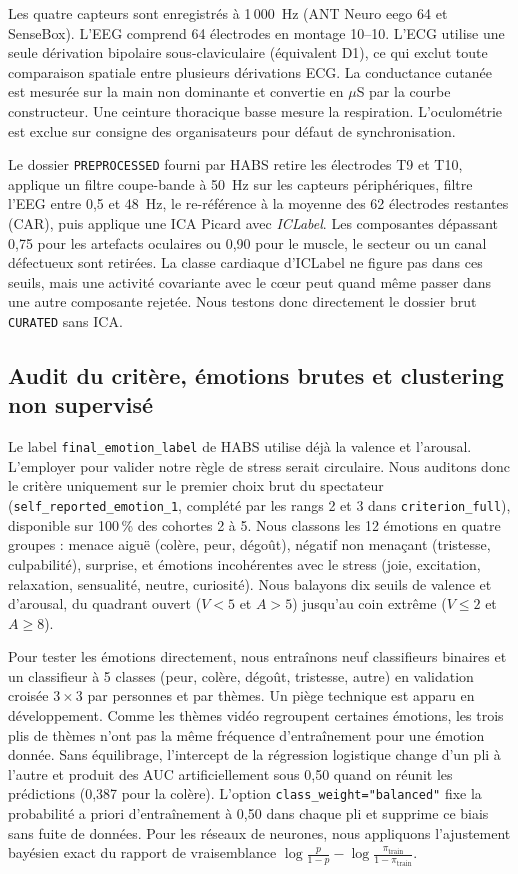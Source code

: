 \documentclass[10pt]{article}
\begin{document}
Les quatre capteurs sont enregistrés à 1\,000~Hz (ANT Neuro eego 64 et SenseBox). L'EEG comprend 64 électrodes en montage 10--10. L'ECG utilise une seule dérivation bipolaire sous-claviculaire (équivalent D1), ce qui exclut toute comparaison spatiale entre plusieurs dérivations ECG. La conductance cutanée est mesurée sur la main non dominante et convertie en $\mu$S par la courbe constructeur. Une ceinture thoracique basse mesure la respiration. L'oculométrie est exclue sur consigne des organisateurs pour défaut de synchronisation.

Le dossier \texttt{PREPROCESSED} fourni par HABS retire les électrodes T9 et T10, applique un filtre coupe-bande à 50~Hz sur les capteurs périphériques, filtre l'EEG entre 0,5 et 48~Hz, le re-référence à la moyenne des 62 électrodes restantes (CAR), puis applique une ICA Picard avec \emph{ICLabel}. Les composantes dépassant 0,75 pour les artefacts oculaires ou 0,90 pour le muscle, le secteur ou un canal défectueux sont retirées. La classe cardiaque d'ICLabel ne figure pas dans ces seuils, mais une activité covariante avec le cœur peut quand même passer dans une autre composante rejetée. Nous testons donc directement le dossier brut \texttt{CURATED} sans ICA.

\subsection{Audit du critère, émotions brutes et clustering non supervisé}

Le label \texttt{final\_emotion\_label} de HABS utilise déjà la valence et l'arousal. L'employer pour valider notre règle de stress serait circulaire. Nous auditons donc le critère uniquement sur le premier choix brut du spectateur (\texttt{self\_reported\_emotion\_1}, complété par les rangs 2 et 3 dans \texttt{criterion\_full}), disponible sur 100\,\% des cohortes 2 à 5. Nous classons les 12 émotions en quatre groupes : menace aiguë (colère, peur, dégoût), négatif non menaçant (tristesse, culpabilité), surprise, et émotions incohérentes avec le stress (joie, excitation, relaxation, sensualité, neutre, curiosité). Nous balayons dix seuils de valence et d'arousal, du quadrant ouvert ($V < 5$ et $A > 5$) jusqu'au coin extrême ($V \le 2$ et $A \ge 8$).

Pour tester les émotions directement, nous entraînons neuf classifieurs binaires et un classifieur à 5 classes (peur, colère, dégoût, tristesse, autre) en validation croisée $3 \times 3$ par personnes et par thèmes. Un piège technique est apparu en développement. Comme les thèmes vidéo regroupent certaines émotions, les trois plis de thèmes n'ont pas la même fréquence d'entraînement pour une émotion donnée. Sans équilibrage, l'intercept de la régression logistique change d'un pli à l'autre et produit des AUC artificiellement sous 0,50 quand on réunit les prédictions (0,387 pour la colère). L'option \texttt{class\_weight="balanced"} fixe la probabilité a priori d'entraînement à 0,50 dans chaque pli et supprime ce biais sans fuite de données. Pour les réseaux de neurones, nous appliquons l'ajustement bayésien exact du rapport de vraisemblance $\log\frac{p}{1-p} - \log\frac{\pi_{\text{train}}}{1-\pi_{\text{train}}}$.
\end{document}
